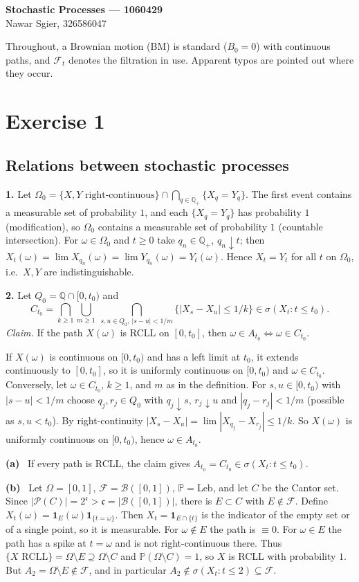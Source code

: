 \documentclass[11pt,a4paper]{article}
\renewcommand{\P}{\mathbb{P}}
\newcommand{\Q}{\mathbb{Q}}
\newcommand{\F}{\mathcal{F}}
\newcommand{\1}{\mathbf{1}}
\newcommand{\Leb}{\mathrm{Leb}}
\newcommand{\prob}[1]{\par\medskip\noindent\textbf{#1}\quad}
\newcommand{\sub}[1]{\par\smallskip\noindent\textbf{#1}\ }
\begin{document}
\begin{center}
{\large\textbf{Stochastic Processes --- 1060429}}\\[2pt]
Nawar Sgier, 326586047
\end{center}

\noindent Throughout, a Brownian motion (BM) is standard ($B_0=0$) with continuous paths, and
$\F_t$ denotes the filtration in use. Apparent typos are pointed out where they occur.

\section*{Exercise 1}
\subsection*{Relations between stochastic processes}

\prob{1.}
Let $\Omega_0=\{X,Y\text{ right-continuous}\}\cap\bigcap_{q\in\Q_+}\{X_q=Y_q\}$. The first event
contains a measurable set of probability $1$, and each $\{X_q=Y_q\}$ has probability $1$
(modification), so $\Omega_0$ contains a measurable set of probability $1$ (countable
intersection). For $\omega\in\Omega_0$ and $t\ge0$ take $q_n\in\Q_+$, $q_n\downarrow t$; then
$X_t(\omega)=\lim X_{q_n}(\omega)=\lim Y_{q_n}(\omega)=Y_t(\omega)$. Hence $X_t=Y_t$ for all $t$ on
$\Omega_0$, i.e.\ $X,Y$ are indistinguishable.

\prob{2.}
Let $Q_0=\Q\cap[0,t_0)$ and
\[
 C_{t_0}=\bigcap_{k\ge1}\bigcup_{m\ge1}\ \bigcap_{s,u\in Q_0,\ |s-u|<1/m}\{|X_s-X_u|\le 1/k\}
 \in\sigma(X_t:t\le t_0).
\]
\textit{Claim.} If the path $X(\omega)$ is RCLL on $[0,t_0]$, then $\omega\in A_{t_0}\iff \omega\in C_{t_0}$.

If $X(\omega)$ is continuous on $[0,t_0)$ and has a left limit at $t_0$, it extends continuously to
$[0,t_0]$, so it is uniformly continuous on $[0,t_0)$ and $\omega\in C_{t_0}$. Conversely, let
$\omega\in C_{t_0}$, $k\ge1$, and $m$ as in the definition. For $s,u\in[0,t_0)$ with $|s-u|<1/m$
choose $q_j,r_j\in Q_0$ with $q_j\downarrow s$, $r_j\downarrow u$ and $|q_j-r_j|<1/m$ (possible as
$s,u<t_0$). By right-continuity $|X_s-X_u|=\lim|X_{q_j}-X_{r_j}|\le1/k$. So $X(\omega)$ is
uniformly continuous on $[0,t_0)$, hence $\omega\in A_{t_0}$.

\sub{(a)} If every path is RCLL, the claim gives $A_{t_0}=C_{t_0}\in\sigma(X_t:t\le t_0)$.

\sub{(b)} Let $\Omega=[0,1]$, $\F=\mathcal B([0,1])$, $\P=\Leb$, and let $C$ be the Cantor set. Since
$|\mathcal P(C)|=2^{\mathfrak c}>\mathfrak c=|\mathcal B([0,1])|$, there is $E\subset C$ with
$E\notin\F$. Define $X_t(\omega)=\1_{E}(\omega)\1_{\{t=\omega\}}$. Then $X_t=\1_{E\cap\{t\}}$ is the
indicator of the empty set or of a single point, so it is measurable. For $\omega\notin E$ the path is $\equiv0$. For
$\omega\in E$ the path has a spike at $t=\omega$ and is not right-continuous there. Thus
$\{X\text{ RCLL}\}=\Omega\setminus E\supseteq\Omega\setminus C$ and $\P(\Omega\setminus C)=1$, so
$X$ is RCLL with probability $1$. But $A_2=\Omega\setminus E\notin\F$, and in particular
$A_2\notin\sigma(X_t:t\le 2)\subseteq\F$.
\end{document}
